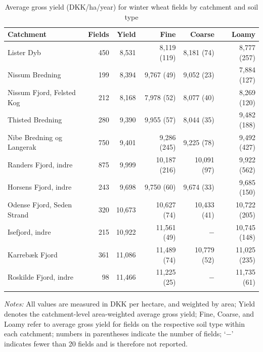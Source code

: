 \documentclass[12pt]{article}
\begin{document}
\begin{table}[H]
\centering
\small
\caption{Average gross yield (DKK/ha/year) for winter wheat fields by catchment and soil type}
\label{tab:yield-vinterhvede}
\begin{threeparttable}
\begin{tabular}{lrrrrr}
\toprule
\textbf{Catchment} & \textbf{Fields} & \textbf{Yield} & \textbf{Fine} &
\textbf{Coarse} & \textbf{Loamy} \\
\midrule\addlinespace
Lister Dyb                 & 450 & 8,531  & 8,119 (119)  & 8,181 (74)   & 8,777 (257) \\
Nissum Bredning            & 199 & 8,394  & 9,767 (49)   & 9,052 (23)   & 7,884 (127) \\
Nissum Fjord, Felsted Kog  & 212 & 8,168  & 7,978 (52)   & 8,077 (40)   & 8,269 (120) \\
Thisted Bredning           & 280 & 9,390  & 9,955 (57)   & 8,044 (35)   & 9,482 (188) \\
Nibe Bredning og Langerak  & 750 & 9,401  & 9,286 (245)  & 9,225 (78)   & 9,492 (427) \\
Randers Fjord, indre       & 875 & 9,999  & 10,187 (216) & 10,091 (97)  & 9,922 (562) \\
Horsens Fjord, indre       & 243 & 9,698  & 9,750 (60)   & 9,674 (33)   & 9,685 (150) \\
Odense Fjord, Seden Strand & 320 & 10,673 & 10,627 (74)  & 10,433 (41)  & 10,722 (205) \\
Isefjord, indre            & 215 & 10,922 & 11,561 (49)  & $-$           & 10,745 (148) \\
Karrebæk Fjord             & 361 & 11,086 & 11,489 (74)  & 10,779 (52)  & 11,025 (235) \\
Roskilde Fjord, indre      &  98 & 11,466 & 11,225 (25)  & $-$           & 11,735 (61) \\
\addlinespace\bottomrule
\end{tabular}
\begin{tablenotes}
\footnotesize
\item \textit{Notes:} All values are measured in DKK per hectare, and weighted by area;
Yield denotes the catchment-level area-weighted average gross yield;
Fine, Coarse, and Loamy refer to average gross yield for fields on the respective
soil type within each catchment; numbers in parentheses indicate the number of
fields; `$-$' indicates fewer than 20 fields and is therefore not reported.
\end{tablenotes}
\end{threeparttable}
\end{table}
\end{document}
